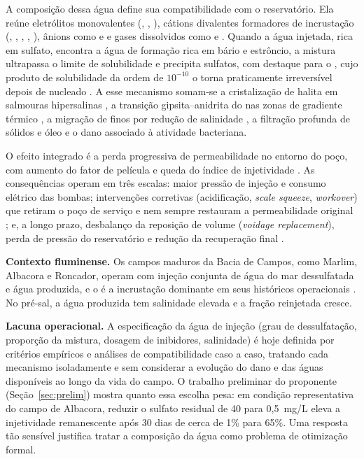 \documentclass[11pt,a4paper]{article}
\begin{document}
A composição dessa água define sua compatibilidade com o reservatório. Ela reúne
eletrólitos monovalentes (, , ), cátions divalentes formadores de
incrustação (, , , , ), ânions como
 e  e gases dissolvidos como  e 
\cite{kamal2018}. Quando a água injetada, rica em sulfato, encontra a água de formação rica
em bário e estrôncio, a mistura ultrapassa o limite de solubilidade e precipita sulfatos,
com destaque para o , cujo produto de solubilidade da ordem de $10^{-10}$ o
torna praticamente irreversível depois de nucleado \cite{binmerdhah2010,bedrikovetsky2009}.
A esse mecanismo somam-se a cristalização de halita em salmouras hipersalinas
\cite{rocha2001,miri2016}, a transição gipsita--anidrita do  nas zonas de gradiente
térmico \cite{kamalipour2017}, a migração de finos por redução de salinidade
\cite{salinity2021}, a filtração profunda de sólidos e óleo \cite{pangsharma1997} e o dano
associado à atividade bacteriana.

O efeito integrado é a perda progressiva de permeabilidade no entorno do poço, com aumento
do fator de película e queda do índice de injetividade \cite{bedrikovetsky2009,pal2023}.
As consequências operam em três escalas: maior pressão de injeção e consumo elétrico das
bombas; intervenções corretivas (acidificação, \textit{scale squeeze}, \textit{workover})
que retiram o poço de serviço e nem sempre restauram a permeabilidade original
\cite{kermani2023,shabani2019}; e, a longo prazo, desbalanço da reposição de volume
(\textit{voidage replacement}), perda de pressão do reservatório e redução da recuperação
final \cite{liang2018}.

\textbf{Contexto fluminense.} Os campos maduros da Bacia de Campos, como Marlim, Albacora
e Roncador, operam com injeção conjunta de água do mar dessulfatada e água produzida, e o
 é a incrustação dominante em seus históricos operacionais
\cite{rocha2001,bezerra2004}. No pré-sal, a água produzida tem salinidade elevada e a
fração reinjetada cresce.

\textbf{Lacuna operacional.} A especificação da água de injeção (grau de dessulfatação,
proporção da mistura, dosagem de inibidores, salinidade) é hoje definida por critérios
empíricos e análises de compatibilidade caso a caso, tratando cada mecanismo
isoladamente e sem considerar a evolução do dano e das águas disponíveis ao longo da vida
do campo. O trabalho preliminar do proponente (Seção~\ref{sec:prelim}) mostra quanto essa
escolha pesa: em condição representativa do campo de Albacora, reduzir o sulfato residual
de 40 para 0,5~mg/L eleva a injetividade remanescente após 30 dias de cerca de 1\% para
65\%. Uma resposta tão sensível justifica tratar a composição da água como problema de
otimização formal.
\end{document}
